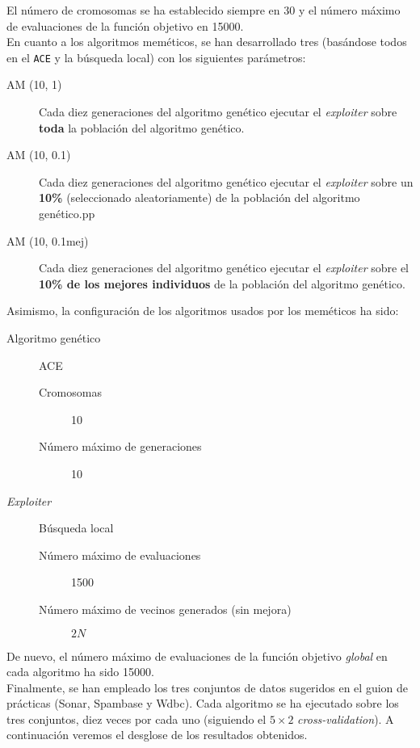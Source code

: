 \documentclass[11pt]{article}
\theoremstyle{plain}
\theoremstyle{definition}
\begin{document}
El número de cromosomas se ha establecido siempre en 30 y el número máximo de evaluaciones de la función objetivo en 15000. \\

En cuanto a los algoritmos meméticos, se han desarrollado tres (basándose todos en el \texttt{ACE} y la búsqueda local) con los siguientes parámetros:

\begin{description}

\item[AM (10, 1)] Cada diez generaciones del algoritmo genético ejecutar el \textit{exploiter} sobre \textbf{toda} la población del algoritmo genético.
\item[AM (10, 0.1)] Cada diez generaciones del algoritmo genético ejecutar el \textit{exploiter} sobre un \textbf{10\%} (seleccionado aleatoriamente) de la población del algoritmo genético.pp
\item[AM (10, 0.1mej)] Cada diez generaciones del algoritmo genético ejecutar el \textit{exploiter} sobre el \textbf{10\% de los mejores individuos} de la población del algoritmo genético.
\end{description}

Asimismo, la configuración de los algoritmos usados por los meméticos ha sido:

\begin{description}
\item[Algoritmo genético] ACE
  \begin{description}
  \item[Cromosomas] 10
  \item[Número máximo de generaciones] 10
  \end{description}
\item[\textit{Exploiter}] Búsqueda local
  \begin{description}
  \item[Número máximo de evaluaciones] 1500
  \item[Número máximo de vecinos generados (sin mejora)] $2N$
  \end{description}
\end{description}

De nuevo, el número máximo de evaluaciones de la función objetivo \textit{global} en cada algoritmo ha sido 15000. \\

Finalmente, se han empleado los tres conjuntos de datos sugeridos en el guion de prácticas (Sonar, Spambase y Wdbc). Cada algoritmo se ha ejecutado sobre los tres conjuntos, diez veces por cada uno (siguiendo el $5 \times 2$ \textit{cross-validation}). A continuación veremos el desglose de los resultados obtenidos.
\end{document}
